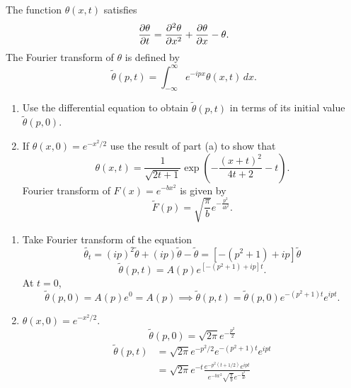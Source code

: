 \documentclass[10pt, a4paper]{article}
\begin{document}
\begin{problem}[$2020$]
    The function $\theta(x, t)$ satisfies
    \[
    \pd[\theta]{t} = \frac{\partial ^ 2\theta}{\partial x ^ 2} + \pd[\theta]{x} - \theta.
    \]
    The Fourier transform of $\theta$ is defined by
    \[
    \tilde{\theta}(p, t) = \int_{-\infty}^{\infty}e ^ {-ipx}\theta(x, t)\,dx.
    \]

    \begin{enumerate}[label = (\alph*)]
        \item Use the differential equation to obtain $\tilde{\theta}(p, t)$ in terms of its initial value $\tilde{\theta}(p, 0)$.

        \item If $\theta(x, 0) = e ^ {-x ^ 2 / 2}$ use the result of part (a) to show that
        \[
        \theta(x, t) = \frac{1}{\sqrt{2t + 1}}\exp\left(-\frac{(x + t) ^ 2}{4t + 2} - t\right).
        \]
        Fourier transform of $F(x) = e ^ {-bx ^ 2}$ is given by
        \[
        \tilde{F}(p) = \sqrt{\frac{\pi}{b}}e ^ {-\frac{p ^ 2}{4b ^ 2}}.
        \]
    \end{enumerate}

    \begin{solution}
        \begin{enumerate}[label = (\alph*)]
            \item Take Fourier transform of the equation
            \[
            \tilde{\theta_t} = (ip) ^ 2\tilde{\theta} + (ip)\tilde{\theta} - \tilde{\theta} = [-(p ^ 2 + 1) + ip]\tilde{\theta}
            \]
            \[
            \tilde{\theta}(p, t) = A(p)e ^ {[-(p ^ 2 + 1) + ip]t}.
            \]
            At $t = 0$,
            \[
            \tilde{\theta}(p, 0) = A(p)e ^ 0 = A(p) \implies \tilde{\theta}(p, t) = \tilde{\theta}(p, 0)e ^ {-(p ^ 2 + 1)t}e ^ {ipt}.
            \]

            \item
            $\theta(x, 0) = e ^ {-x ^ 2 / 2}$.
            \[
            \tilde{\theta}(p, 0) = \sqrt{2\pi}e ^ {-\frac{p ^ 2}{2}}
            \]
            \begin{align*}
                \tilde{\theta}(p, t) &= \sqrt{2\pi}e ^ {-p ^ 2 / 2}e ^ {-(p ^ 2 + 1)t}e ^ {ipt} \\
                &= \sqrt{2\pi}e ^ {-t}\frac{e ^ {-p ^ 2(t + 1 / 2)}e ^ {ipt}}{e ^ {-bx ^ 2}\sqrt{\frac{\pi}{b}}e ^ {-\frac{p ^ 2}{4b}}} \\
            \end{align*}


\end{enumerate}
\end{solution}
\end{problem}
\end{document}
